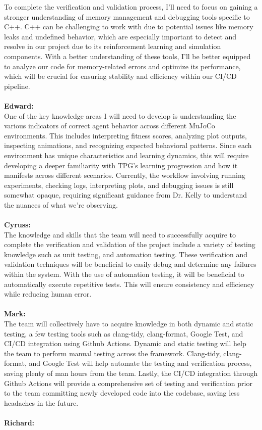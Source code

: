 \documentclass[12pt, titlepage]{article}
\begin{document}
    \noindent To complete the verification and validation process,  I’ll need to focus on gaining a stronger understanding of memory management and debugging tools specific to C++. C++ can be challenging to work with due to potential issues like memory leaks and undefined behavior, which are especially important to detect and resolve in our project due to its reinforcement learning and simulation components. With a better understanding of these tools, I’ll be better equipped to analyze our code for memory-related errors and optimize its performance, which will be crucial for ensuring stability and efficiency within our CI/CD pipeline.
\\\\
    \textbf{Edward:}\\
  
    \noindent One of the key knowledge areas I will need to develop is understanding the various indicators of correct agent behavior across different MuJoCo environments. This includes interpreting fitness scores, analyzing plot outputs, inspecting animations, and recognizing expected behavioral patterns. Since each environment has unique characteristics and learning dynamics, this will require developing a deeper familiarity with TPG's learning progression and how it manifests across different scenarios. Currently, the workflow involving running experiments, checking logs, interpreting plots, and debugging issues is still somewhat opaque, requiring significant guidance from Dr. Kelly to understand the nuances of what we're observing.
\\\\
    \textbf{Cyruss:}\\
    
    \noindent The knowledge and skills that the team will need to successfully acquire to complete the verification and validation of the project include a variety of testing knowledge such as unit testing, and automation testing. These verification and validation techniques will be beneficial to easily debug and determine any failures within the system. With the use of automation testing, it will be beneficial to automatically execute repetitive tests. This will ensure consistency and efficiency while reducing human error.
\\\\
     \textbf{Mark:}\\
    
     \noindent The team will collectively have to acquire knowledge in both dynamic and static testing, a few testing tools such as clang-tidy, clang-format, Google Test, and CI/CD integration using Github Actions. Dynamic and static testing will help the team to perform manual testing across the framework. Clang-tidy, clang-format, and Google Test will help automate the testing and verification process, saving plenty of man hours from the team. Lastly, the CI/CD integration through Github Actions will provide a comprehensive set of testing and verification prior to the team committing newly developed code into the codebase, saving less headaches in the future.
\\\\
    \textbf{Richard:}\\
\end{document}
